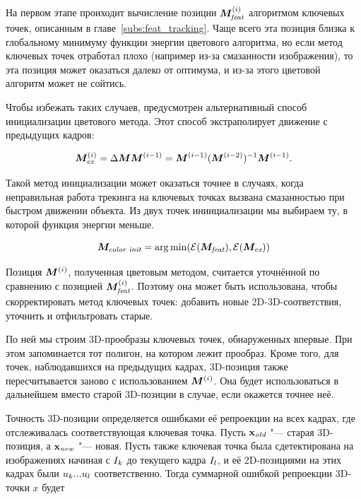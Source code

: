 На первом этапе проиходит вычисление позиции $\bm{M}^{\left( i \right)}_{\text {\it feat}}$
алгоритмом
ключевых точек, описанным в главе~\ref{subs:feat_tracking}.
Чаще всего эта позиция близка к глобальному минимуму функции энергии цветового
алгоритма, но если метод ключевых точек отработал плохо (например из-за
смазанности изображения), то эта позиция может оказаться далеко от оптимума, и
из-за этого цветовой алгоритм может не сойтись.

Чтобы избежать таких случаев, предусмотрен альтернативный способ инициализации
цветового метода.
Этот способ экстраполирует движение с предыдущих кадров: 

\begin{equation}
\label{eqn:extrapolation}
\bm{M}^{\left( i \right)}_{\text{\it ex}} = \Delta \bm{M} \bm{M}^{\left( i - 1 \right)} = \bm{M}^{\left( i -
1 \right)}(\bm{M}^{\left( i - 2 \right)})^{-1} \bm{M}^{\left( i - 1 \right)}
\text{.}
\end{equation}

Такой метод инициализации может оказаться точнее в случаях, когда неправильная
работа трекинга на ключевых точках вызвана смазанностью при быстром движении
объекта.
Из двух точек иниициализации мы выбираем ту, в которой функция энергии меньше.

\begin{equation}
\label{eqn:init_selection}
\bm{M}_{\text{\it color init}} = \operatorname*{arg\,min}(\mathcal{E}(\bm{M}_{\text {\it feat}}),
\mathcal{E}(\bm{M}_{\text{\it ex}}))
\end{equation}

Позиция $\bm{M}^{\left( i \right)}$, полученная цветовым методом, считается уточнённой
по сравнению с позицией $\bm{M}^{\left( i \right)}_{\text {\it feat}}$.
Поэтому она может быть использована, чтобы скорректировать метод ключевых
точек: добавить новые 2D-3D-соответствия, уточнить и отфильтровать старые.

По ней мы строим 3D-прообразы ключевых точек, обнаруженных впервые.
При этом запоминается тот полигон, на котором лежит прообраз.
Кроме того, для точек, наблюдавшихся на предыдущих кадрах, 3D-позиция также
пересчитывается заново с использованием $\bm{M}^{\left( i \right)}$.
Она будет использоваться в дальнейшем вместо старой 3D-позиции в случае, если
окажется точнее неё.

Точность 3D-позиции определяется ошибками её репроекции на всех кадрах, где
отслеживалась соответствующая ключевая точка.
Пусть $\mathbf{x_{\text {\it old}}}$ "--- старая 3D-позиция, а $\mathbf{x_{\text{\it new}}}$ "--- новая. 
Пусть также ключевая точка была сдетектирована на изображениях начиная с
$I_k$
до текущего кадра $I_l$, и её 2D-позициями на этих кадрах были $\mathnormal{u}_k ...
\mathnormal{u}_l$
соответственно.
Тогда суммарной ошибкой репроекции 3D-точки $x$ будет

